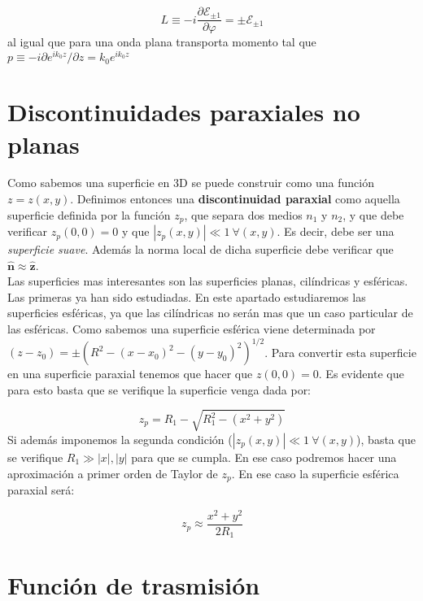 \documentclass[12pt,a4paper]{book}
\numberwithin{equation}{section}
\numberwithin{figure}{section}
\newcommand{\parciales}[2]{\frac{\partial #1}{\partial #2}}
\newcommand{\1}{_{(1)}}
\newcommand{\2}{_{(2)}}
\newcommand{\zn}{\mathbf{z}}
\newcommand{\nn}{\mathbf{n}}
\newcommand{\hnz}{\hat{\zn}}
\newcommand{\hnn}{\hat{\nn}}
\theoremstyle{definition}
\begin{document}
\begin{equation}
L \equiv - i \parciales{\mathcal{E}_{\pm 1}}{\varphi} = \pm \mathcal{E}_{\pm 1} 
\end{equation}
al igual que para una onda plana transporta momento tal que $p \equiv - i \partial e^{i k_0 z} / \partial z = k_0 e^{i k_0 z}$

\section{Discontinuidades paraxiales no planas}

Como sabemos una superficie en 3D se puede construir como una función $z=z(x,y)$. Definimos entonces una \textbf{discontinuidad paraxial} como aquella superficie definida por la función $z_p$, que separa dos medios $n_1$ y $n_2$, y que debe verificar $z_p (0,0) = 0$ y que $|z_p (x,y) |\ll 1 \ \forall (x,y)$. Es decir, debe ser una \textit{superficie suave}. Además la norma local de dicha superficie debe verificar que $\hnn \approx \hnz$. \\

Las superficies mas interesantes son las superficies planas, cilíndricas y esféricas. Las primeras ya han sido estudiadas. En este apartado estudiaremos las superficies esféricas, ya que las cilíndricas no serán mas que un caso particular de las esféricas. Como sabemos una superficie esférica viene determinada por $(z-z_0) = \pm  (R^2 - (x-x_0)^2 - (y-y_0)^2)^{1/2}$. Para convertir esta superficie en una superficie paraxial tenemos que hacer que $z(0,0)=0$. Es evidente que para esto basta que se verifique la superficie venga dada por:

\begin{equation}
z_{p} = R_1  - \sqrt{R_1^2 - (x^2+y^2)}
\end{equation}
Si además imponemos la segunda condición ($|z_p (x,y) |\ll 1 \ \forall (x,y)$), basta que se verifique $R_1 \gg |x|,|y|$ para que se cumpla. En ese caso podremos hacer una aproximación a primer orden de Taylor de $z_{p}$. En ese caso la superficie esférica paraxial será:

\begin{equation}
z_p \approx \frac{x^2+y^2}{2 R_1}
\end{equation}


\section{Función de trasmisión}
\end{document}
